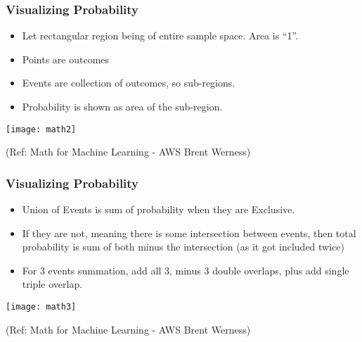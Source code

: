 \begin{frame}
\frametitle{Visualizing Probability}
\begin{itemize}
\item  Let rectangular region being of entire sample space. Area is ``1''.
\item Points are outcomes
\item Events are collection of outcomes, so sub-regions.
\item Probability is shown as area of the sub-region.
\end{itemize}

\begin{center}
\texttt{[image: math2]}
\end{center}

\tiny{(Ref: Math for Machine Learning - AWS Brent Werness)}
\end{frame}

\begin{frame}
\frametitle{Visualizing Probability}
\begin{itemize}
\item  Union of Events is sum of probability when they are Exclusive.
\item If they are not, meaning there is some intersection between events, then total probability is sum of both minus the intersection (as it got included twice)
\item For 3 events summation, add all 3, minus 3 double overlaps, plus add single triple overlap.
\end{itemize}

\begin{center}
\texttt{[image: math3]}
\end{center}

\tiny{(Ref: Math for Machine Learning - AWS Brent Werness)}
\end{frame}

